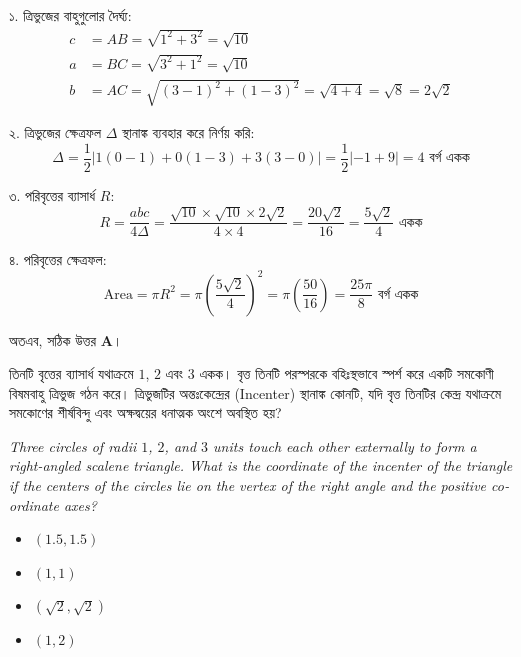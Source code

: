 \documentclass[12pt, a4paper]{article}
\begin{document}
\begin{tcolorbox}[solutionbox={সমাধান (Solution)}]
    \noindent
    ১. ত্রিভুজের বাহুগুলোর দৈর্ঘ্য: 
    \begin{align*}
        c &= AB = \sqrt{1^2 + 3^2} = \sqrt{10} \\
        a &= BC = \sqrt{3^2 + 1^2} = \sqrt{10} \\
        b &= AC = \sqrt{(3-1)^2 + (1-3)^2} = \sqrt{4+4} = \sqrt{8} = 2\sqrt{2}
    \end{align*}
    
    ২. ত্রিভুজের ক্ষেত্রফল $\Delta$ স্থানাঙ্ক ব্যবহার করে নির্ণয় করি: 
    \[ \Delta = \frac{1}{2} |1(0-1) + 0(1-3) + 3(3-0)| = \frac{1}{2} |-1 + 9| = 4 \text{ বর্গ একক} \]
    
    ৩. পরিবৃত্তের ব্যাসার্ধ $R$:
    \[ R = \frac{abc}{4\Delta} = \frac{\sqrt{10} \times \sqrt{10} \times 2\sqrt{2}}{4 \times 4} = \frac{20\sqrt{2}}{16} = \frac{5\sqrt{2}}{4} \text{ একক} \]
    
    ৪. পরিবৃত্তের ক্ষেত্রফল: 
    \[ \text{Area} = \pi R^2 = \pi \left(\frac{5\sqrt{2}}{4}\right)^2 = \pi \left(\frac{50}{16}\right) = \frac{25\pi}{8} \text{ বর্গ একক} \]
    
    অতএব, সঠিক উত্তর \textbf{A}।
\end{tcolorbox}
\begin{tcolorbox}[questionbox={প্রশ্ন (Question) 47}]
    \noindent
    তিনটি বৃত্তের ব্যাসার্ধ যথাক্রমে $1$, $2$ এবং $3$ একক। বৃত্ত তিনটি পরস্পরকে বহিঃস্থভাবে স্পর্শ করে একটি সমকোণী বিষমবাহু ত্রিভুজ গঠন করে। ত্রিভুজটির অন্তঃকেন্দ্রের (Incenter) স্থানাঙ্ক কোনটি, যদি বৃত্ত তিনটির কেন্দ্র যথাক্রমে সমকোণের শীর্ষবিন্দু এবং অক্ষদ্বয়ের ধনাত্মক অংশে অবস্থিত হয়?
    
    \vspace{0.8em}
    \begin{english}
    \noindent\textit{\color{darkgray}
    Three circles of radii $1$, $2$, and $3$ units touch each other externally to form a right-angled scalene triangle. What is the coordinate of the incenter of the triangle if the centers of the circles lie on the vertex of the right angle and the positive coordinate axes?
    }
    \end{english}
\end{tcolorbox}

\vspace{1em}
\begin{itemize}[label={}, leftmargin=1cm, itemsep=0.5em]
    \item[\textbf{A)}] $(1.5, 1.5)$
    \item[\textbf{B)}] $(1, 1)$
    \item[\textbf{C)}] $(\sqrt{2}, \sqrt{2})$
    \item[\textbf{D)}] $(1, 2)$
\end{itemize}
\end{document}
